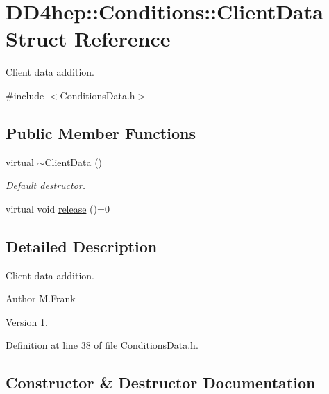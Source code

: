 \hypertarget{struct_d_d4hep_1_1_conditions_1_1_client_data}{}\section{D\+D4hep\+:\+:Conditions\+:\+:Client\+Data Struct Reference}
\label{struct_d_d4hep_1_1_conditions_1_1_client_data}


Client data addition.  




{\ttfamily \#include $<$Conditions\+Data.\+h$>$}

\subsection*{Public Member Functions}
\begin{DoxyCompactItemize}
\item 
virtual \hyperlink{struct_d_d4hep_1_1_conditions_1_1_client_data_a722d09ec49cd3e0f33c1394a78441070}{$\sim$\+Client\+Data} ()
\begin{DoxyCompactList}\small\item\em Default destructor. \end{DoxyCompactList}\item 
virtual void \hyperlink{struct_d_d4hep_1_1_conditions_1_1_client_data_a70db3debbb53fc7249ca198a2cd32e9b}{release} ()=0
\end{DoxyCompactItemize}


\subsection{Detailed Description}
Client data addition. 

\begin{DoxyAuthor}{Author}
M.\+Frank 
\end{DoxyAuthor}
\begin{DoxyVersion}{Version}
1. 
\end{DoxyVersion}


Definition at line 38 of file Conditions\+Data.\+h.



\subsection{Constructor \& Destructor Documentation}
\hypertarget{struct_d_d4hep_1_1_conditions_1_1_client_data_a722d09ec49cd3e0f33c1394a78441070}{}\label{struct_d_d4hep_1_1_conditions_1_1_client_data_a722d09ec49cd3e0f33c1394a78441070} 
